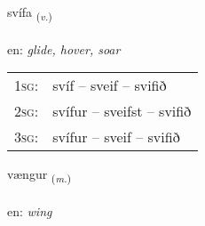 \documentclass[frontgrid, backgrid]{flacards}\usepackage[]{graphicx}\usepackage[]{xcolor}
\begin{document}
\renewcommand{\flhead}{\vskip5pt \fboxsep=0pt {\small\bfseries\footnotesize Sagnorð | Verb}}
\renewcommand{\fcfoot}{\vskip5pt \fboxsep=0pt \hspace{2pt}{\small\bfseries\footnotesize 3K}}

\renewcommand{\blhead}{\vskip5pt {\small\bfseries\footnotesize Sagnorð | Verb }}
\renewcommand{\bcfoot}{\vskip5pt \hspace{2pt}{\small\bfseries\footnotesize 3K}}


{svífa \small{\textsubscript{(\textit{v.})}} \\[1ex] %
\textphonetic{[sviːva]} \\
en: \emph{glide, hover, soar} \\  [2ex]
\renewcommand*{\arraystretch}{0.8}
\begin{tabular}{p{1cm}l}
\textsc{1sg}: & svíf -- sveif -- svifið \\ 
\textsc{2sg}: & svífur -- sveifst -- svifið \\ 
\textsc{3sg}: & svífur -- sveif -- svifið \\ 
\end{tabular}
}

\renewcommand{\flhead}{\vskip5pt \fboxsep=0pt {\small\bfseries\footnotesize Nafnorð | Noun}}
\renewcommand{\fcfoot}{\vskip5pt \fboxsep=0pt \hspace{2pt}{\small\bfseries\footnotesize 3K}}

\renewcommand{\blhead}{\vskip5pt {\small\bfseries\footnotesize Nafnorð | Noun }}
\renewcommand{\bcfoot}{\vskip5pt \hspace{2pt}{\small\bfseries\footnotesize 3K}}


{vængur \small{\textsubscript{(\textit{m.})}} \\[1ex] %
\textphonetic{[vaiŋkʏr]} \\
en: \emph{wing} \\  [2ex]
\renewcommand*{\arraystretch}{0.8}
}
\end{document}
